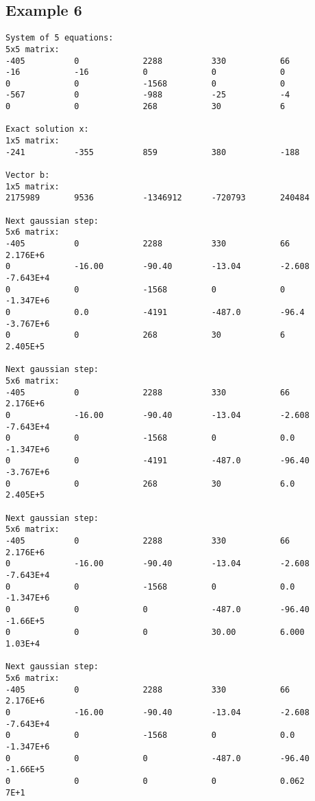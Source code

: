 \documentclass[letterpaper,12pt]{article}
\begin{document}
\subsection{Example 6}
\label{a:E6}
\begin{verbatim}
System of 5 equations:
5x5 matrix:
-405          0             2288          330           66            
-16           -16           0             0             0             
0             0             -1568         0             0             
-567          0             -988          -25           -4            
0             0             268           30            6             

Exact solution x:
1x5 matrix:
-241          -355          859           380           -188          

Vector b:
1x5 matrix:
2175989       9536          -1346912      -720793       240484        

Next gaussian step:
5x6 matrix:
-405          0             2288          330           66            2.176E+6      
0             -16.00        -90.40        -13.04        -2.608        -7.643E+4     
0             0             -1568         0             0             -1.347E+6     
0             0.0           -4191         -487.0        -96.4         -3.767E+6     
0             0             268           30            6             2.405E+5      

Next gaussian step:
5x6 matrix:
-405          0             2288          330           66            2.176E+6      
0             -16.00        -90.40        -13.04        -2.608        -7.643E+4     
0             0             -1568         0             0.0           -1.347E+6     
0             0             -4191         -487.0        -96.40        -3.767E+6     
0             0             268           30            6.0           2.405E+5      

Next gaussian step:
5x6 matrix:
-405          0             2288          330           66            2.176E+6      
0             -16.00        -90.40        -13.04        -2.608        -7.643E+4     
0             0             -1568         0             0.0           -1.347E+6     
0             0             0             -487.0        -96.40        -1.66E+5      
0             0             0             30.00         6.000         1.03E+4       

Next gaussian step:
5x6 matrix:
-405          0             2288          330           66            2.176E+6      
0             -16.00        -90.40        -13.04        -2.608        -7.643E+4     
0             0             -1568         0             0.0           -1.347E+6     
0             0             0             -487.0        -96.40        -1.66E+5      
0             0             0             0             0.062         7E+1          


\end{verbatim}
\end{document}
